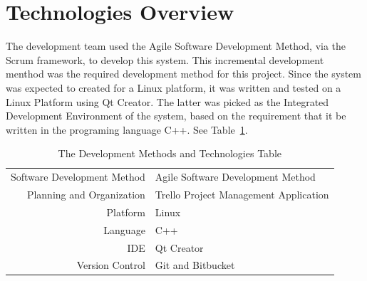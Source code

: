\section{Technologies Overview}
The development team used the Agile Software Development Method, via the Scrum framework, to develop
this system.  This incremental development menthod was the required development method for this project.
Since the system was expected to created for a Linux platform, it was written and tested on a Linux Platform 
using Qt Creator.  The latter was picked as the Integrated Development Environment of the system, based on
the requirement that it be written in the programing language C++.
See Table~\ref{DevelopmentTable}.  
\begin{table}[tbh]
\begin{center}
\begin{tabular}{|r|l|}
  \hline
  Software Development Method & Agile Software Development Method \\
  Planning and Organization & Trello Project Management Application \\
  \hline \hline
  Platform & Linux \\
  Language & C++ \\  
  IDE & Qt Creator \\
  Version Control & Git and Bitbucket
  \\ \cline{2-2}
  
  \hline
\end{tabular}
\caption{The Development Methods and Technologies Table \label{DevelopmentTable}}
\end{center}
\end{table}

